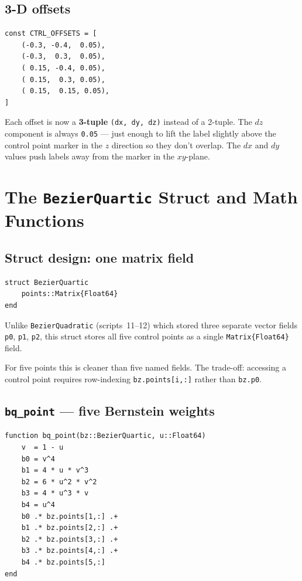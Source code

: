\documentclass[12pt, a4paper]{article}
\newcommand{\cd}[1]{\texttt{#1}}
\begin{document}
\subsection{3-D offsets}

\begin{verbatim}
const CTRL_OFFSETS = [
    (-0.3, -0.4,  0.05),
    (-0.3,  0.3,  0.05),
    ( 0.15, -0.4, 0.05),
    ( 0.15,  0.3, 0.05),
    ( 0.15,  0.15, 0.05),
]
\end{verbatim}

Each offset is now a \textbf{3-tuple} \cd{(dx, dy, dz)}
instead of a 2-tuple.
The $dz$ component is always \cd{0.05} ---
just enough to lift the label slightly above the
control point marker in the $z$ direction so they
don't overlap.
The $dx$ and $dy$ values push labels away from the
marker in the $xy$-plane.


\section{The \texttt{BezierQuartic} Struct and Math Functions}

\subsection{Struct design: one matrix field}

\begin{verbatim}
struct BezierQuartic
    points::Matrix{Float64}
end
\end{verbatim}

Unlike \cd{BezierQuadratic} (scripts~11--12) which stored
three separate vector fields \cd{p0}, \cd{p1}, \cd{p2},
this struct stores all five control points as a single
\cd{Matrix\{Float64\}} field.

For five points this is cleaner than five named fields.
The trade-off: accessing a control point requires
row-indexing \cd{bz.points[i,:]} rather than \cd{bz.p0}.

\subsection{\texttt{bq\_point} --- five Bernstein weights}

\begin{verbatim}
function bq_point(bz::BezierQuartic, u::Float64)
    v  = 1 - u
    b0 = v^4
    b1 = 4 * u * v^3
    b2 = 6 * u^2 * v^2
    b3 = 4 * u^3 * v
    b4 = u^4
    b0 .* bz.points[1,:] .+
    b1 .* bz.points[2,:] .+
    b2 .* bz.points[3,:] .+
    b3 .* bz.points[4,:] .+
    b4 .* bz.points[5,:]
end
\end{verbatim}
\end{document}
